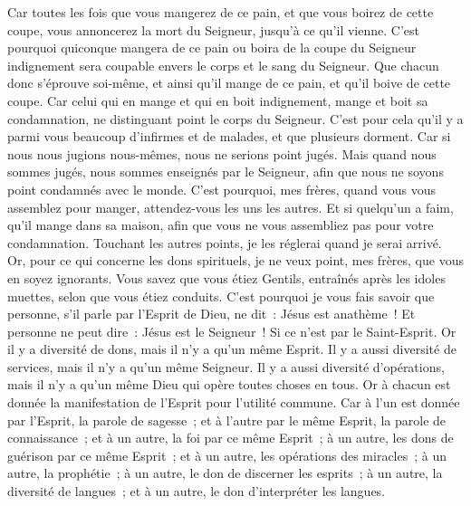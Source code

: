 \begin{multicols}{2}
Car toutes les fois que vous mangerez de ce pain, et que vous boirez de cette coupe, vous annoncerez la mort du Seigneur, jusqu'à ce qu'il vienne.
C'est pourquoi quiconque mangera de ce pain ou boira de la coupe du Seigneur indignement sera coupable envers le corps et le sang du Seigneur.
Que chacun donc s'éprouve soi-même, et ainsi qu'il mange de ce pain, et qu'il boive de cette coupe.
Car celui qui en mange et qui en boit indignement, mange et boit sa condamnation, ne distinguant point le corps du Seigneur.
C'est pour cela qu'il y a parmi vous beaucoup d'infirmes et de malades, et que plusieurs dorment.
Car si nous nous jugions nous-mêmes, nous ne serions point jugés.
Mais quand nous sommes jugés, nous sommes enseignés par le Seigneur, afin que nous ne soyons point condamnés avec le monde.
C'est pourquoi, mes frères, quand vous vous assemblez pour manger, attendez-vous les uns les autres.
Et si quelqu'un a faim, qu'il mange dans sa maison, afin que vous ne vous assembliez pas pour votre condamnation. Touchant les autres points, je les réglerai quand je serai arrivé.
\VerseOne{}Or, pour ce qui concerne les dons spirituels, je ne veux point, mes frères, que vous en soyez ignorants.
Vous savez que vous étiez Gentils, entraînés après les idoles muettes, selon que vous étiez conduits.
C'est pourquoi je vous fais savoir que personne, s'il parle par l'Esprit de Dieu, ne dit~: Jésus est anathème~! Et personne ne peut dire~: Jésus est le Seigneur~! Si ce n'est par le Saint-Esprit.
Or il y a diversité de dons, mais il n'y a qu'un même Esprit.
Il y a aussi diversité de services, mais il n'y a qu'un même Seigneur.
Il y a aussi diversité d'opérations, mais il n'y a qu'un même Dieu qui opère toutes choses en tous.
Or à chacun est donnée la manifestation de l'Esprit pour l'utilité commune.
Car à l'un est donnée par l'Esprit, la parole de sagesse~; et à l'autre par le même Esprit, la parole de connaissance~;
et à un autre, la foi par ce même Esprit~; à un autre, les dons de guérison par ce même Esprit~;
et à un autre, les opérations des miracles~; à un autre, la prophétie~; à un autre, le don de discerner les esprits~; à un autre, la diversité de langues~; et à un autre, le don d'interpréter les langues.

\end{multicols}

